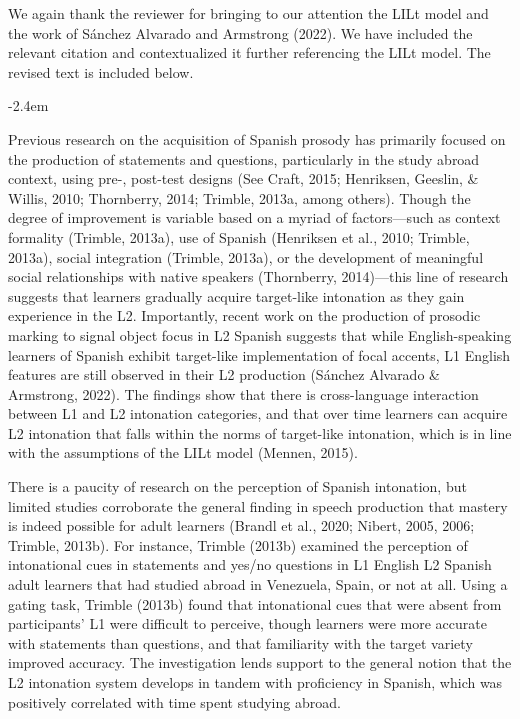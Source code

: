 \documentclass[]{article}
\renewenvironment{quote}{\begin{fquote}\advance\leftmargini -2.4em\begin{oldquote}}{\end{oldquote}\end{fquote}}
\newenvironment{fquote}
  {\def\FrameCommand{
	\fboxsep=0.6em %
	\fcolorbox{black}{white}}%
    \MakeFramed {\advance\hsize-2\width \FrameRestore}
    \begin{minipage}{\linewidth}
  }
  {\end{minipage}\endMakeFramed}
\begin{document}
We again thank the reviewer for bringing to our attention the LILt model and the work of Sánchez Alvarado and Armstrong (2022).
We have included the relevant citation and contextualized it further referencing the LILt model.
The revised text is included below.

\begin{quote}
Previous research on the acquisition of Spanish prosody has primarily focused on the production of statements and questions, particularly in the study abroad context, using pre-, post-test designs (See Craft, 2015; Henriksen, Geeslin, \& Willis, 2010; Thornberry, 2014; Trimble, 2013a, among others).
Though the degree of improvement is variable based on a myriad of factors---such as context formality (Trimble, 2013a), use of Spanish (Henriksen et al., 2010; Trimble, 2013a), social integration (Trimble, 2013a), or the development of meaningful social relationships with native speakers (Thornberry, 2014)---this line of research suggests that learners gradually acquire target-like intonation as they gain experience in the L2.
Importantly, recent work on the production of prosodic marking to signal object focus in L2 Spanish suggests that while English-speaking learners of Spanish exhibit target-like implementation of focal accents, L1 English features are still observed in their L2 production (Sánchez Alvarado \& Armstrong, 2022).
The findings show that there is cross-language interaction between L1 and L2 intonation categories, and that over time learners can acquire L2 intonation that falls within the norms of target-like intonation, which is in line with the assumptions of the LILt model (Mennen, 2015).

There is a paucity of research on the perception of Spanish intonation, but limited studies corroborate the general finding in speech production that mastery is indeed possible for adult learners (Brandl et al., 2020; Nibert, 2005, 2006; Trimble, 2013b).
For instance, Trimble (2013b) examined the perception of intonational cues in statements and yes/no questions in L1 English L2 Spanish adult learners that had studied abroad in Venezuela, Spain, or not at all.
Using a gating task, Trimble (2013b) found that intonational cues that were absent from participants' L1 were difficult to perceive, though learners were more accurate with statements than questions, and that familiarity with the target variety improved accuracy.
The investigation lends support to the general notion that the L2 intonation system develops in tandem with proficiency in Spanish, which was positively correlated with time spent studying abroad.
\end{quote}
\end{document}
